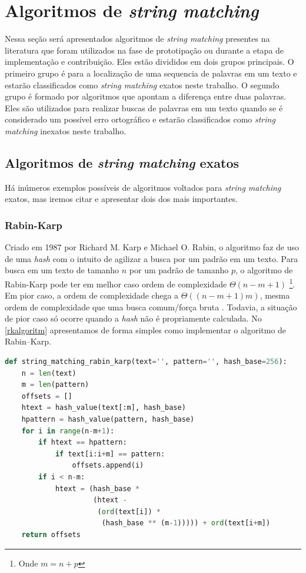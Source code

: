 \section{\nmu Algoritmos de  \textit{string matching}} %
\label{sec:algoritimos_de_textit}


Nessa seção será apresentados algoritmos de \textit{string matching} presentes na literatura que foram utilizados na fase de prototipação ou durante a etapa de implementação e contribuição. Eles estão divididos em dois grupos principais. O primeiro grupo é para a localização de uma sequencia de palavras em um texto e estarão classificados como \textit{string matching} exatos neste trabalho. O segundo grupo é formado por algoritmos que apontam a diferença entre duas palavras. Eles são utilizados para realizar buscas de palavras em um texto quando se é considerado um possível erro ortográfico e estarão classificados como \textit{string matching} inexatos neste trabalho.

\subsection{\nmu Algoritmos de \textit{string matching} exatos} %
\label{sub:algoritimos_de_textit}

Há inúmeros exemplos possíveis de algoritmos voltados para \textit{string matching} exatos, mas iremos citar e apresentar dois dos mais importantes.

\subsubsection*{Rabin-Karp} %
\label{ssub:rabin_karp}

Criado  em 1987  por  Richard M. Karp e Michael O. Rabin, o algoritmo faz de uso de uma \textit{hash} com o intuito de agilizar a busca por um padrão em um texto. Para busca em um texto de tamanho $n$ por um padrão de tamanho $p$, o algoritmo de Rabin-Karp pode ter em melhor caso ordem de complexidade $\Theta(n-m+1)$ \cite{paulo2015algoritmos}\footnote{Onde $m=n+p$}. Em pior caso, a ordem de complexidade chega a $\Theta((n-m+1)m)$, mesma ordem de complexidade que uma busca comum/força bruta \cite{paulo2015algoritmos}. Todavia, a situação de pior caso só ocorre quando a \textit{hash} não é propriamente calculada. No \autoref{rkalgoritm} apresentamos de forma simples como implementar o algoritmo de Rabin–Karp.

\begin{lstlisting}[language=Python,label=rkalgoritm,caption={Algoritmo de Rabin–Karp}]
def string_matching_rabin_karp(text='', pattern='', hash_base=256):
    n = len(text)
    m = len(pattern)
    offsets = []
    htext = hash_value(text[:m], hash_base)
    hpattern = hash_value(pattern, hash_base)
    for i in range(n-m+1):
        if htext == hpattern:
            if text[i:i+m] == pattern:
                offsets.append(i)
        if i < n-m:
            htext = (hash_base *
                     (htext -
                      (ord(text[i]) *
                       (hash_base ** (m-1))))) + ord(text[i+m])
    return offsets
\end{lstlisting}

